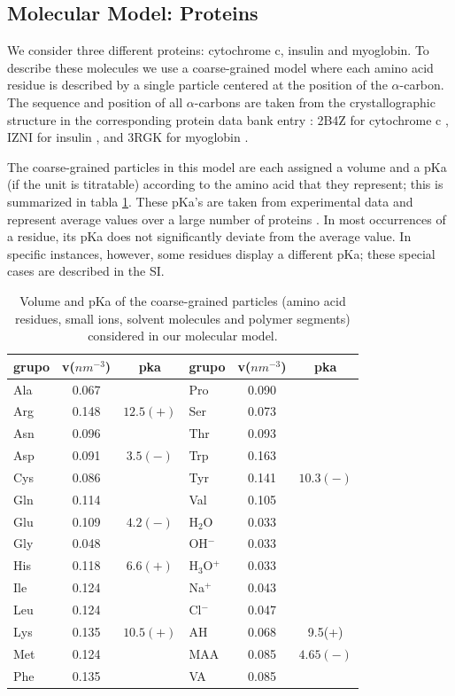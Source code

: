 \subsection{Molecular Model: Proteins}\label{sect:protein}


We consider three different proteins:  cytochrome c, insulin and myoglobin.
To describe these molecules we use a coarse-grained model where each amino acid residue is described by a single particle centered at the position of the $\alpha$-carbon.
The sequence and position of all $\alpha$-carbons are taken from the crystallographic structure in the corresponding protein data bank entry : 2B4Z for cytochrome c , IZNI for insulin , and 3RGK for myoglobin \addcite[hubbard1990x]. 
 
 

The coarse-grained particles in this model are each assigned a volume and a pKa (if the unit is titratable) according to the amino acid that they represent; 
this is summarized in  tabla \ref{table:Coarse-grain}.
These pKa's are taken from experimental data and represent average values over a large number of proteins .
In most occurrences of a residue, its pKa does not significantly deviate from the average value.
In  specific instances, however, some residues display a different pKa;
these special cases are described in the SI.


\begin{table}
\centering
\small
\begin{tabular}{|lcc|lcc|}
\hline
grupo & v($nm^{-3}$) & pka & grupo & v($nm^{-3}$) & pka \\
\hline
Ala & 0.067 &  & Pro & 0.090 & \\
Arg & 0.148 & $12.5 (+)$& Ser & 0.073 &\\
Asn & 0.096 &  & Thr & 0.093 & \\
Asp & 0.091 & $3.5 (-)$ & Trp & 0.163 &\\
Cys & 0.086 &  & Tyr & 0.141 & $10.3 (-)$\\
Gln & 0.114 & & Val & 0.105 &\\  
Glu & 0.109 & $4.2 (-)$ & H$_2$O & 0.033 & \\ 
Gly & 0.048 &  & OH$^-$ & 0.033 & \\
His & 0.118 & $6.6 (+)$& H$_3$O$^+$ & 0.033 &  \\ 
Ile & 0.124 &  & Na$^+$ & 0.043 & \\ %
Leu & 0.124 &  & Cl$^-$ & 0.047 & \\
Lys & 0.135 & $10.5 (+)$ & AH & 0.068 &  9.5(+)\\
Met & 0.124 & & MAA & 0.085 & $4.65(-)$\\
Phe & 0.135 &   & VA & 0.085 & \\
\hline
\end{tabular}
\caption{Volume and pKa of the coarse-grained particles (amino acid residues, small ions, solvent molecules and polymer segments)  considered in our molecular model.}
\label{table:Coarse-grain} 
\end{table}


